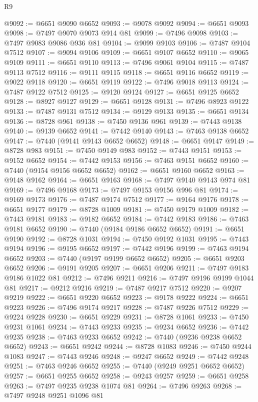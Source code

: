 \begin{lexlean}{R9}
\begin{coremodule}
@9092 := @6651 @9090 @6652
@9093 := @9078 @9092
@9094 := @6651 @9093
@9098 := @7497 @9070 @9073 @914 @81
@9099 := @7496 @9098
@9103 := @7497 @9083 @9086 @936 @81
@9104 := @9099 @9103
@9106 := @7487 @9104 @7512
@9107 := @9094 @9106
@9109 := @6651 @9107 @6652
@9110 := @9065 @9109
@9111 := @6651 @9110
@9113 := @7496 @9061 @9104
@9115 := @7487 @9113 @7512
@9116 := @9111 @9115
@9118 := @6651 @9116 @6652
@9119 := @9022 @9118
@9120 := @6651 @9119
@9122 := @7496 @9018 @9113
@9124 := @7487 @9122 @7512
@9125 := @9120 @9124
@9127 := @6651 @9125 @6652
@9128 := @8927 @9127
@9129 := @6651 @9128
@9131 := @7496 @8923 @9122
@9133 := @7487 @9131 @7512
@9134 := @9129 @9133
@9135 := @6651 @9134
@9136 := @8728 @961
@9138 := @7450 @9136 @961
@9139 := @7443 @9138
@9140 := @9139 @6652
@9141 := @7442 @9140
@9143 := @7463 @9138 @6652
@9147 := @7440 (@9141 @9143 @6652 @6652)
@9148 := @6651 @9147
@9149 := @8728 @983
@9151 := @7450 @9149 @983
@9152 := @7443 @9151
@9153 := @9152 @6652
@9154 := @7442 @9153
@9156 := @7463 @9151 @6652
@9160 := @7440 (@9154 @9156 @6652 @6652)
@9162 := @6651 @9160 @6652
@9163 := @9148 @9162
@9164 := @6651 @9163
@9168 := @7497 @9140 @9143 @974 @81
@9169 := @7496 @9168
@9173 := @7497 @9153 @9156 @996 @81
@9174 := @9169 @9173
@9176 := @7487 @9174 @7512
@9177 := @9164 @9176
@9178 := @6651 @9177
@9179 := @8728 @1009
@9181 := @7450 @9179 @1009
@9182 := @7443 @9181
@9183 := @9182 @6652
@9184 := @7442 @9183
@9186 := @7463 @9181 @6652
@9190 := @7440 (@9184 @9186 @6652 @6652)
@9191 := @6651 @9190
@9192 := @8728 @1031
@9194 := @7450 @9192 @1031
@9195 := @7443 @9194
@9196 := @9195 @6652
@9197 := @7442 @9196
@9199 := @7463 @9194 @6652
@9203 := @7440 (@9197 @9199 @6652 @6652)
@9205 := @6651 @9203 @6652
@9206 := @9191 @9205
@9207 := @6651 @9206
@9211 := @7497 @9183 @9186 @1022 @81
@9212 := @7496 @9211
@9216 := @7497 @9196 @9199 @1044 @81
@9217 := @9212 @9216
@9219 := @7487 @9217 @7512
@9220 := @9207 @9219
@9222 := @6651 @9220 @6652
@9223 := @9178 @9222
@9224 := @6651 @9223
@9226 := @7496 @9174 @9217
@9228 := @7487 @9226 @7512
@9229 := @9224 @9228
@9230 := @6651 @9229
@9231 := @8728 @1061
@9233 := @7450 @9231 @1061
@9234 := @7443 @9233
@9235 := @9234 @6652
@9236 := @7442 @9235
@9238 := @7463 @9233 @6652
@9242 := @7440 (@9236 @9238 @6652 @6652)
@9243 := @6651 @9242
@9244 := @8728 @1083
@9246 := @7450 @9244 @1083
@9247 := @7443 @9246
@9248 := @9247 @6652
@9249 := @7442 @9248
@9251 := @7463 @9246 @6652
@9255 := @7440 (@9249 @9251 @6652 @6652)
@9257 := @6651 @9255 @6652
@9258 := @9243 @9257
@9259 := @6651 @9258
@9263 := @7497 @9235 @9238 @1074 @81
@9264 := @7496 @9263
@9268 := @7497 @9248 @9251 @1096 @81

\end{coremodule}
\end{lexlean}
